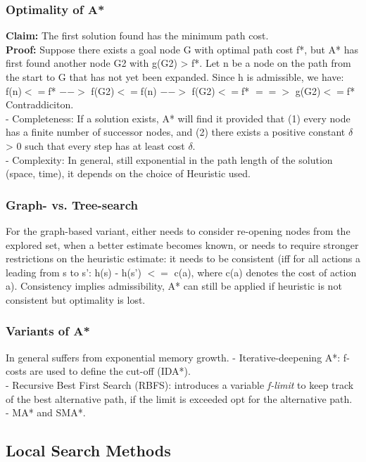 \documentclass{article}
\begin{document}
\subsubsection{Optimality of A*}
\textbf{Claim: }The first solution found has the minimum path cost.\\
\textbf{Proof: }Suppose there exists a goal node G with optimal path cost f*, but
A* has first found another node G2 with g(G2) > f*. Let n be a node on the path from the start to G that has not yet been expanded. Since h is admissible, we have: f(n)$<=$f* $-->$ f(G2)$<=$f(n) $-->$ f(G2)$<=$f* $==>$ g(G2)$<=$f* Contraddiciton.\\
- Completeness: If a solution exists, A* will find it provided that (1) every node has a finite number of successor nodes, and (2) there exists a positive constant $\delta$ > 0 such that every step has at least cost $\delta$.\\
- Complexity: In general, still exponential in the path length of the solution (space, time), it depends on the choice of Heuristic used.
\subsubsection{Graph- vs. Tree-search}
For the graph-based variant, either needs to consider re-opening nodes from the explored set, when a better estimate becomes known, or needs to require stronger restrictions on the heuristic estimate: it needs to be consistent (iff for all actions a leading from s to s': h(s) - h(s') $<=$ c(a), where c(a) denotes the cost of action a). Consistency implies admissibility, A* can still be applied if heuristic is not consistent but optimality is lost.
\subsubsection{Variants of A*}
In general suffers from exponential memory growth.
- Iterative-deepening A*: f-costs are used to define the cut-off (IDA*).\\
- Recursive Best First Search (RBFS): introduces a variable \textit{f-limit} to
keep track of the best alternative path, if the limit is exceeded opt for the alternative path.\\
- MA* and SMA*.

\subsection{Local Search Methods}
\end{document}

